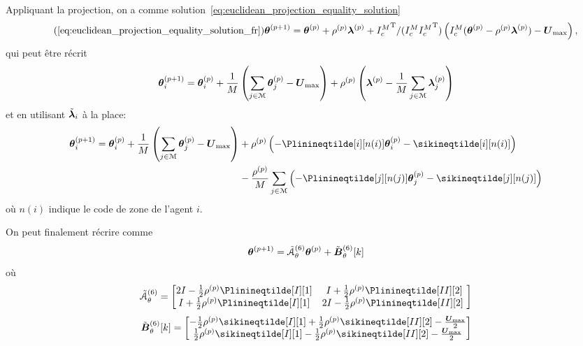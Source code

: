 \documentclass[../main.tex]{subfiles}
\begin{document}
Appliquant la projection, on a comme solution~\eqref{eq:euclidean_projection_equality_solution}
\begin{equation}
  \label{eq:euclidean_projection_equality_solution_reprise_fr}
  \tag{\ref*{eq:euclidean_projection_equality_solution_fr}}
  \vec{\theta}\pplusone=\vec{\theta}\p+\rho\p\vec{\lambda}\p+{I_{c}^M}\T/({I_{c}^M} {I_{c}^M}\T)\left({I_{c}^M}(\vec{\theta}\p-\rho\p\vec{\lambda}\p) -\vec{U}_{\max}\right),
\end{equation}
qui peut être récrit
\begin{equation}
  \boldsymbol{\theta}_{i}^{(p+1)}= \boldsymbol{\theta}_{i}^{(p)} + \frac{1}{M}\left(\sum_{j\in\mathcal{M}}\boldsymbol{\theta}_{j}^{(p)}-\boldsymbol{U}_{\max}\right) + \rho^{(p)}\left(\boldsymbol{\lambda}^{(p)}-\frac{1}{M}\sum_{j\in\mathcal{M}}\boldsymbol{\lambda}_j^{(p)}\right)
\end{equation}
et en utilisant $\tilde{\boldsymbol{\lambda}}_{i}$ à la place:
\begin{align}
  \vec{\theta}_{i}\pplusone=
  \vec{\theta}_{i}\p+
  \frac{1}{M}\left(\sum_{j\in\set{M}}\vec{\theta}_{j}\p-\vec{U}_{\max}\right)&
                                                                     + \rho\p\left(
                                                                     -\Plinineqtilde[i][n(i)]\thetai\p-\sikineqtilde[i][n(i)]
                                                                     \right) \notag\\
                                                                   &-\frac{\rho\p}{M}\sum_{j\in\set{M}}\left(
                                                                     -\Plinineqtilde[j][n(j)]\vec{\theta}_{j}\p-\sikineqtilde[j][n(j)]
                                                                     \right)
\end{align}
où $n(i)$ indique le code de zone de l'agent $i$.

On peut finalement récrire comme
\begin{equation}
  \boldsymbol{\theta}^{(p+1)}=\tilde{\mathcal{A}}_{\theta}^{(6)}\boldsymbol{\theta}^{(p)}+\tilde{\mathcal{\boldsymbol{B}}}_{\theta}^{(6)}[k]
\end{equation}
où
\begin{equation}
  \tilde{\mathcal{A}}_{\theta}^{(6)}=\left[
    \begin{matrix}
      2I-\frac{1}{2}\rho\p \Plinineqtilde[I][1] & I+\frac{1}{2}\rho\p \Plinineqtilde[II][2]\\
      I+\frac{1}{2}\rho\p \Plinineqtilde[I][1] & 2I-\frac{1}{2}\rho\p \Plinineqtilde[II][2]\
    \end{matrix}
  \right]
\end{equation}
\begin{equation}
  \tilde{\mathcal{\vec{B}}}_{\theta}^{(6)}[k]=\left[
    \begin{matrix}
      -\frac{1}{2}\rho\p \sikineqtilde[I][1]+\frac{1}{2}\rho\p \sikineqtilde[II][2]-\frac{\vec{U}_{\max}}{2}\\
      \frac{1}{2}\rho\p \sikineqtilde[I][1]-\frac{1}{2}\rho\p \sikineqtilde[II][2]-\frac{\vec{U}_{\max}}{2}
    \end{matrix}
  \right]
\end{equation}
\end{document}
